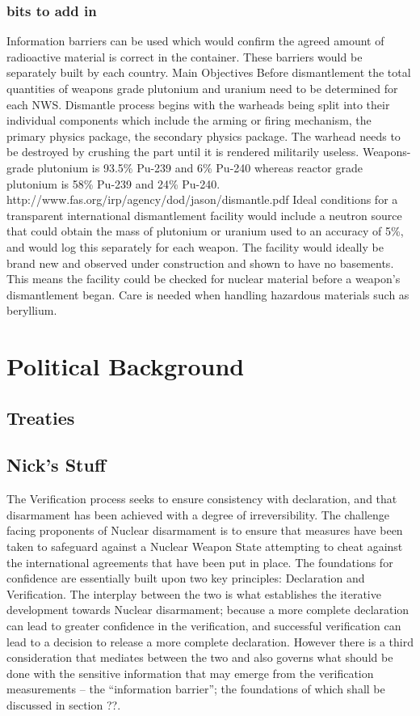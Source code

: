 \documentclass[a4paper]{article}
\begin{document}
\subsubsection{bits to add in}
Information barriers can be used which would confirm the agreed amount of 
radioactive material is correct in the container. These barriers would be 
separately built by each country.
Main Objectives
Before dismantlement the total quantities of weapons grade plutonium and 
uranium need to be determined for each NWS. 
Dismantle process begins with the warheads being split into their individual 
components which include the arming or firing mechanism, the primary physics 
package, the secondary physics package.
The warhead needs to be destroyed by crushing the part until it is rendered 
militarily useless.
Weapons-grade plutonium is 93.5\% Pu-239 and 6\% Pu-240 whereas reactor grade 
plutonium is 58\% Pu-239 and 24\% Pu-240.
http://www.fas.org/irp/agency/dod/jason/dismantle.pdf
Ideal conditions for a transparent international dismantlement facility would 
include a neutron source that could obtain the mass of plutonium or uranium 
used to an accuracy of 5\%, and would log this separately for each weapon. 
The facility would ideally be brand new and observed under construction and 
shown to have no basements. This means the facility could be checked for 
nuclear material before a weapon’s dismantlement began. 
Care is needed when handling hazardous materials such as beryllium.

\section{Political Background}
\subsection{Treaties}

\subsection{Nick's Stuff}
The Verification process seeks to ensure consistency with declaration, 
and that disarmament has been achieved with a degree of irreversibility. 
The challenge facing proponents of Nuclear disarmament is to ensure that 
measures have been taken to safeguard against a Nuclear Weapon State 
attempting to cheat against the international agreements that have been 
put in place. The foundations for confidence are essentially built upon 
two key principles: Declaration and Verification. The interplay between 
the two is what establishes the iterative development towards Nuclear 
disarmament; because a more complete declaration can lead to greater 
confidence in the verification, and successful verification can lead to a 
decision to release a more complete declaration. However there is a third 
consideration that mediates between the two and also governs what should be 
done with the sensitive information that may emerge from the verification 
measurements -- the ``information barrier''; the foundations of which shall 
be discussed in section ??. 
\end{document}
